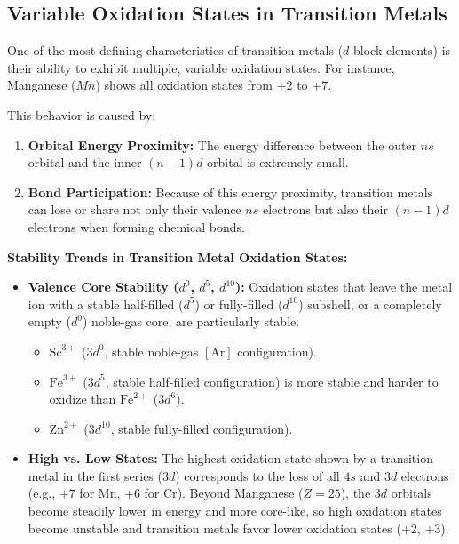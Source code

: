 \documentclass[12pt,a4paper]{article}
\begin{document}
\subsection{Variable Oxidation States in Transition Metals}
One of the most defining characteristics of transition metals ($d$-block elements) is their ability to exhibit multiple, variable oxidation states. For instance, Manganese ($Mn$) shows all oxidation states from $+2$ to $+7$.

This behavior is caused by:
\begin{enumerate}
  \item \textbf{Orbital Energy Proximity:} The energy difference between the outer $ns$ orbital and the inner $(n-1)d$ orbital is extremely small.
  \item \textbf{Bond Participation:} Because of this energy proximity, transition metals can lose or share not only their valence $ns$ electrons but also their $(n-1)d$ electrons when forming chemical bonds.
\end{enumerate}

\textbf{Stability Trends in Transition Metal Oxidation States:}
\begin{itemize}[leftmargin=*, itemsep=2pt]
  \item \textbf{Valence Core Stability ($d^0$, $d^5$, $d^{10}$):} Oxidation states that leave the metal ion with a stable half-filled ($d^5$) or fully-filled ($d^{10}$) subshell, or a completely empty ($d^0$) noble-gas core, are particularly stable.
    \begin{itemize}
      \item $\text{Sc}^{3+}$ ($3d^0$, stable noble-gas $[\text{Ar}]$ configuration).
      \item $\text{Fe}^{3+}$ ($3d^5$, stable half-filled configuration) is more stable and harder to oxidize than $\text{Fe}^{2+}$ ($3d^6$).
      \item $\text{Zn}^{2+}$ ($3d^{10}$, stable fully-filled configuration).
    \end{itemize}
  \item \textbf{High vs. Low States:} The highest oxidation state shown by a transition metal in the first series ($3d$) corresponds to the loss of all $4s$ and $3d$ electrons (e.g., $+7$ for $\text{Mn}$, $+6$ for $\text{Cr}$). Beyond Manganese ($Z=25$), the $3d$ orbitals become steadily lower in energy and more core-like, so high oxidation states become unstable and transition metals favor lower oxidation states ($+2$, $+3$).
\end{itemize}
\end{document}
